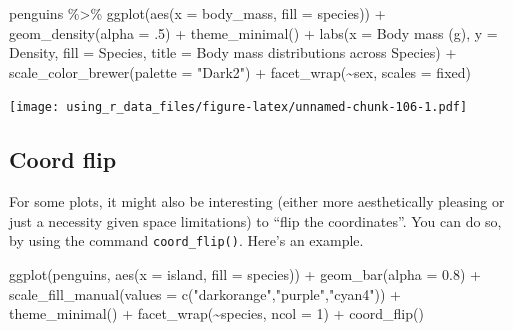\documentclass[
]{book}
\newenvironment{Shaded}{\begin{snugshade}}{\end{snugshade}}
\newcommand{\AttributeTok}[1]{\textcolor[rgb]{0.77,0.63,0.00}{#1}}
\newcommand{\DecValTok}[1]{\textcolor[rgb]{0.00,0.00,0.81}{#1}}
\newcommand{\FloatTok}[1]{\textcolor[rgb]{0.00,0.00,0.81}{#1}}
\newcommand{\FunctionTok}[1]{\textcolor[rgb]{0.00,0.00,0.00}{#1}}
\newcommand{\NormalTok}[1]{#1}
\newcommand{\SpecialCharTok}[1]{\textcolor[rgb]{0.00,0.00,0.00}{#1}}
\newcommand{\StringTok}[1]{\textcolor[rgb]{0.31,0.60,0.02}{#1}}
\begin{document}
\begin{Shaded}
\begin{Highlighting}[]
\NormalTok{penguins }\SpecialCharTok{\%\textgreater{}\%} 
  \FunctionTok{ggplot}\NormalTok{(}\FunctionTok{aes}\NormalTok{(}\AttributeTok{x =}\NormalTok{ body\_mass, }\AttributeTok{fill =}\NormalTok{ species)) }\SpecialCharTok{+} 
  \FunctionTok{geom\_density}\NormalTok{(}\AttributeTok{alpha =}\NormalTok{ .}\DecValTok{5}\NormalTok{) }\SpecialCharTok{+}
  \FunctionTok{theme\_minimal}\NormalTok{() }\SpecialCharTok{+}
  \FunctionTok{labs}\NormalTok{(}\AttributeTok{x =} \StringTok{\textquotesingle{}Body mass (g)\textquotesingle{}}\NormalTok{, }\AttributeTok{y =} \StringTok{\textquotesingle{}Density\textquotesingle{}}\NormalTok{,}
       \AttributeTok{fill =} \StringTok{\textquotesingle{}Species\textquotesingle{}}\NormalTok{, }
       \AttributeTok{title =} \StringTok{\textquotesingle{}Body mass distributions across Species\textquotesingle{}}\NormalTok{) }\SpecialCharTok{+}
  \FunctionTok{scale\_color\_brewer}\NormalTok{(}\AttributeTok{palette =} \StringTok{"Dark2"}\NormalTok{) }\SpecialCharTok{+}
  \FunctionTok{facet\_wrap}\NormalTok{(}\SpecialCharTok{\textasciitilde{}}\NormalTok{sex, }\AttributeTok{scales =} \StringTok{\textquotesingle{}fixed\textquotesingle{}}\NormalTok{)}
\end{Highlighting}
\end{Shaded}

\texttt{[image: using\_r\_data\_files/figure-latex/unnamed-chunk-106-1.pdf]}

\hypertarget{coord-flip}{%
\subsection{Coord flip}\label{coord-flip}}

For some plots, it might also be interesting (either more aesthetically pleasing or just a necessity given space limitations) to ``flip the coordinates''.
You can do so, by using the command \texttt{coord\_flip()}.
Here's an example.

\begin{Shaded}
\begin{Highlighting}[]
\FunctionTok{ggplot}\NormalTok{(penguins, }\FunctionTok{aes}\NormalTok{(}\AttributeTok{x =}\NormalTok{ island, }\AttributeTok{fill =}\NormalTok{ species)) }\SpecialCharTok{+}
  \FunctionTok{geom\_bar}\NormalTok{(}\AttributeTok{alpha =} \FloatTok{0.8}\NormalTok{) }\SpecialCharTok{+}
  \FunctionTok{scale\_fill\_manual}\NormalTok{(}\AttributeTok{values =} \FunctionTok{c}\NormalTok{(}\StringTok{"darkorange"}\NormalTok{,}\StringTok{"purple"}\NormalTok{,}\StringTok{"cyan4"}\NormalTok{)) }\SpecialCharTok{+}
  \FunctionTok{theme\_minimal}\NormalTok{() }\SpecialCharTok{+}
  \FunctionTok{facet\_wrap}\NormalTok{(}\SpecialCharTok{\textasciitilde{}}\NormalTok{species, }\AttributeTok{ncol =} \DecValTok{1}\NormalTok{) }\SpecialCharTok{+}
  \FunctionTok{coord\_flip}\NormalTok{()}
\end{Highlighting}
\end{Shaded}
\end{document}
